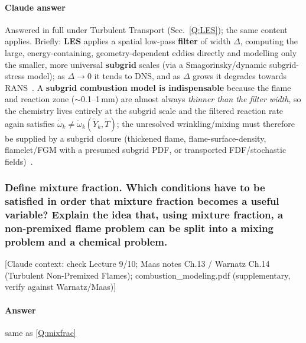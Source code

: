 {\color{istblue}
\paragraph{Claude answer}
Answered in full under Turbulent Transport (Sec.~\ref{Q:LES}); the same content applies. Briefly: \textbf{LES} applies a spatial low-pass \textbf{filter} of width $\Delta$, computing the large, energy-containing, geometry-dependent eddies directly and modelling only the smaller, more universal \textbf{subgrid} scales (via a Smagorinsky/dynamic subgrid-stress model); as $\Delta\to0$ it tends to DNS, and as $\Delta$ grows it degrades towards RANS~\cite{lecture10,pope2000turbulent,veynante2002turbulent}. A \textbf{subgrid combustion model is indispensable} because the flame and reaction zone ($\sim$0.1--1\,mm) are almost always \emph{thinner than the filter width}, so the chemistry lives entirely at the subgrid scale and the filtered reaction rate again satisfies $\overline{\dot\omega}_k\neq\dot\omega_k(\tilde Y_k,\tilde T)$; the unresolved wrinkling/mixing must therefore be supplied by a subgrid closure (thickened flame, flame-surface-density, flamelet/FGM with a presumed subgrid PDF, or transported FDF/stochastic fields)~\cite{lecture10}.
}




\subsubsection{Define mixture fraction. Which conditions have to be satisfied in order that mixture fraction becomes a useful variable? Explain the idea that, using mixture fraction, a non-premixed flame problem can be split into a mixing problem and a chemical problem.}

{\color{gray}\footnotesize [Claude context: check Lecture 9/10; Maas notes Ch.13 / Warnatz Ch.14 (Turbulent Non-Premixed Flames); combustion\_modeling.pdf (supplementary, verify against Warnatz/Maas)]}

\paragraph{Answer} same as \ref{Q:mixfrac}

